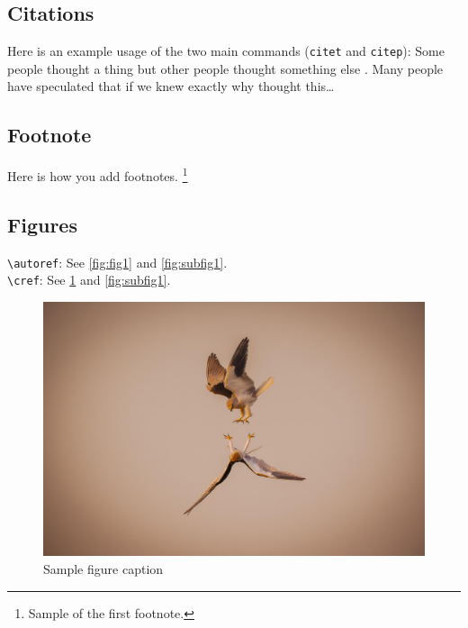 \documentclass[onecolumn]{article}
\theoremstyle{definition}
\theoremstyle{remark}
\begin{document}
\subsection{Citations}

Here is an example usage of the two main commands (\verb+citet+ and \verb+citep+): Some people thought a thing \citep{kour2014real, hadash2018estimate} but other people thought something else \citep{kour2014fast}. Many people have speculated that if we knew exactly why \citet{kour2014fast} thought this\dots

\subsection{Footnote}

Here is how you add footnotes. \footnote{Sample of the first footnote.}

\subsection{Figures}

\verb+\autoref+: See \autoref{fig:fig1} and \autoref{fig:subfig1}. \\
\verb+\cref+: See \cref{fig:fig1} and \cref{fig:subfig1}. 


\begin{figure}[h]
    \centering
    \includegraphics[width=.3\linewidth]{fig/example1.jpg}
    \caption{Sample figure caption}
    \label{fig:fig1}
\end{figure}
\end{document}

